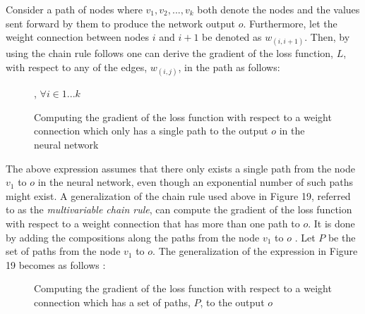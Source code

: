 \documentclass[titlepage]{article}
\begin{document}
\noindent
Consider a path of nodes where $v_{1}, v_{2}, ..., v_{k}$ both denote the nodes and the values sent forward by them to produce the network output $o$. Furthermore, let the weight connection between nodes $i$ and $i+1$ be denoted as $w_{(i, i+1)}$. Then, by using the chain rule follows \cite{charu} one can derive the gradient of the loss function, $L$, with respect to any of the edges, $w_{(i, j)}$, in the path as follows:

\vskip 0.3cm

\begin{figure}[h]
    \centerline{, $\forall i \in 1 ... k$}
    \vskip 0.3cm
    \caption{Computing the gradient of the loss function with respect to a weight connection which only has a single path to the output $o$ in the neural network}
\end{figure}

\newpage

\noindent
The above expression assumes that there only exists a single path from the node $v_{1}$ to $o$ in the neural network, even though an exponential number of such paths might exist. A generalization of the chain rule used above in Figure 19, referred to as the \emph{multivariable chain rule}, can compute the gradient of the loss function with respect to a weight connection that has more than one path to $o$. It is done by adding the compositions along the paths from the node $v_{1}$ to $o$ \cite{charu}. Let $P$ be the set of paths from the node $v_{1}$ to $o$. The generalization of the expression in Figure 19 becomes as follows \cite{charu}:

\vskip 0.3cm

\begin{figure}[h]
    \centerline{}
    \vskip 0.3cm
    \caption{Computing the gradient of the loss function with respect to a weight connection which has a set of paths, $P$, to the output $o$}
\end{figure}

\vskip 0.3cm
\end{document}
